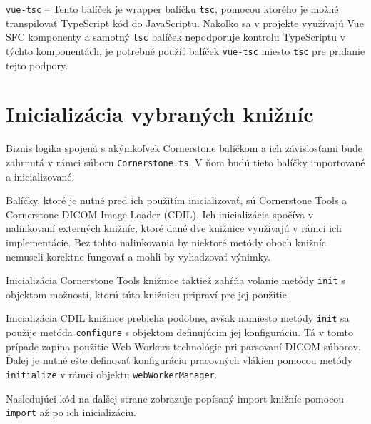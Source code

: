 \clearpage

\texttt{vue-tsc} -- Tento balíček je wrapper balíčku \texttt{tsc}, pomocou ktorého je možné transpilovať TypeScript kód do JavaScriptu. Nakoľko sa v projekte využívajú Vue SFC komponenty a samotný \texttt{tsc} balíček nepodporuje kontrolu TypeScriptu v týchto komponentách, je potrebné použiť balíček \texttt{vue-tsc} miesto \texttt{tsc} pre pridanie tejto podpory. 

\section {Inicializácia vybraných knižníc}
Biznis logika spojená s akýmkoľvek Cornerstone balíčkom a ich závislosťami bude zahrnutá v rámci súboru \texttt{Cornerstone.ts}. V ňom budú tieto balíčky importované a inicializované.

Balíčky, ktoré je nutné pred ich použitím inicializovať, sú Cornerstone Tools a Cornerstone DICOM Image Loader (CDIL). Ich inicializácia spočíva v nalinkovaní externých knižníc, ktoré dané dve knižnice využívajú v rámci ich implementácie. Bez tohto nalinkovania by niektoré metódy oboch knižníc nemuseli korektne fungovať a mohli by vyhadzovať výnimky.

Inicializácia Cornerstone Tools knižnice taktiež zahŕňa volanie metódy \texttt{init} s objektom možností, ktorú túto knižnicu pripraví pre jej použitie.

Inicializácia CDIL knižnice prebieha podobne, avšak namiesto metódy \texttt{init} sa použije metóda \texttt{configure} s objektom definujúcim jej konfiguráciu. Tá v tomto prípade zapína použitie Web Workers technológie pri parsovaní DICOM súborov. Ďalej je nutné ešte definovať konfiguráciu pracovných vlákien pomocou metódy \texttt{initialize} v rámci objektu \texttt{webWorkerManager}.

Nasledujúci kód na ďalšej strane zobrazuje popísaný import knižníc pomocou \texttt{import} až po ich inicializáciu.


